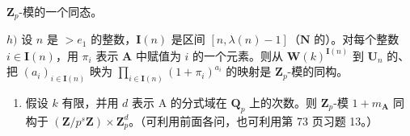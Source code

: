 \(\mathbf{Z}_{p}\)-模的一个同态。

\(h)\) 设 \(n\) 是 \(>e_{1}\) 的整数，\(\mathbf{I}(n)\) 是区间 \([n, \lambda(n) - 1]\)（\(\mathbf{N}\) 的）。对每个整数 \(i \in \mathbf{I}(n)\)，用 \(\pi_{i}\) 表示 \(\mathbf{A}\) 中赋值为 \(i\) 的一个元素。则从 \(\mathbf{W}(k)^{\mathbf{I}(n)}\) 到 \(\mathbf{U}_{n}\) 的、把 \((a_{i})_{i \in \mathbf{I}(n)}\) 映为 \(\prod_{i \in \mathbf{I}(n)} (1 + \pi_{i})^{a_{i}}\) 的映射是 \(\mathbf{Z}_{p}\)-模的同构。

\begin{enumerate}
\def\labelenumi{\roman{enumi})}
\tightlist
\item
  假设 \(k\) 有限，并用 \(d\) 表示 A 的分式域在 \(\mathbf{Q}_{p}\) 上的次数。则 \(\mathbf{Z}_{p}\)-模 \(1 + m_{\mathbf{A}}\) 同构于 \((\mathbf{Z}/p^{s}\mathbf{Z}) \times \mathbf{Z}_{p}^{d}\)。（可利用前面各问，也可利用第 73 页习题 13。）
\end{enumerate}

